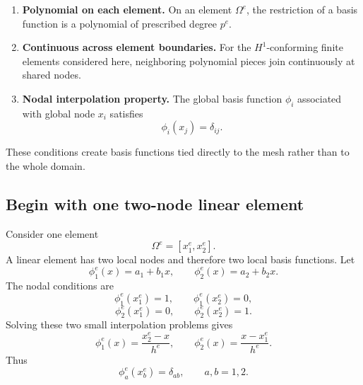 \documentclass[11pt]{article}
\newcommand{\Om}{\Omega}
\begin{document}
\begin{enumerate}
\item \textbf{Polynomial on each element.}
      On an element $\Om^e$, the restriction of a basis function is a
      polynomial of prescribed degree $p^e$.
\item \textbf{Continuous across element boundaries.}
      For the $H^1$-conforming finite elements considered here, neighboring
      polynomial pieces join continuously at shared nodes.
\item \textbf{Nodal interpolation property.}
      The global basis function $\phi_i$ associated with global node $x_i$
      satisfies
      \begin{equation}
      \phi_i(x_j)=\delta_{ij}.
      \label{eq:nodal-property}
      \end{equation}
\end{enumerate}

These conditions create basis functions tied directly to the mesh rather than
to the whole domain.

\subsection{Begin with one two-node linear element}

Consider one element
\[
\Om^e=[x_1^e,x_2^e].
\]
A linear element has two local nodes and therefore two local basis functions.
Let
\[
\phi_1^e(x)=a_1+b_1x,
\qquad
\phi_2^e(x)=a_2+b_2x.
\]
The nodal conditions are
\[
\phi_1^e(x_1^e)=1,\qquad \phi_1^e(x_2^e)=0,
\]
\[
\phi_2^e(x_1^e)=0,\qquad \phi_2^e(x_2^e)=1.
\]
Solving these two small interpolation problems gives
\begin{equation}
\boxed{
\phi_1^e(x)=\frac{x_2^e-x}{h^e},
\qquad
\phi_2^e(x)=\frac{x-x_1^e}{h^e}.}
\label{eq:linear-local-basis}
\end{equation}
Thus
\[
\phi_a^e(x_b^e)=\delta_{ab},\qquad a,b=1,2.
\]

\begin{center}
\end{center}
\end{document}
